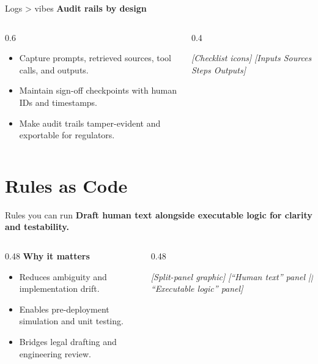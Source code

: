 \documentclass[10pt, aspectratio=169]{beamer}
\newcommand{\placeholder}[1]{\textit{[#1]}}
\begin{document}
\begin{frame}{Logs \textgreater{} vibes}
  \textbf{Audit rails by design}
  \begin{columns}[T]
    \begin{column}{0.6\textwidth}
      \begin{itemize}
        \item Capture prompts, retrieved sources, tool calls, and outputs.
        \item Maintain sign-off checkpoints with human IDs and timestamps.
        \item Make audit trails tamper-evident and exportable for regulators.
      \end{itemize}
    \end{column}
    \begin{column}{0.4\textwidth}
      \begin{block}{\placeholder{Checklist icons}}
        \centering
        \placeholder{Inputs \textbullet{} Sources \textbullet{} Steps \textbullet{} Outputs}
      \end{block}
    \end{column}
  \end{columns}
\end{frame}

\section{Rules as Code}

\begin{frame}{Rules you can run}
  \textbf{Draft human text alongside executable logic for clarity and testability.}
  \vspace{1em}
  \begin{columns}[T]
    \begin{column}{0.48\textwidth}
      \textbf{Why it matters}
      \begin{itemize}
        \item Reduces ambiguity and implementation drift.
        \item Enables pre-deployment simulation and unit testing.
        \item Bridges legal drafting and engineering review.
      \end{itemize}
    \end{column}
    \begin{column}{0.48\textwidth}
      \begin{block}{\placeholder{Split-panel graphic}}
        \centering
        \placeholder{``Human text'' panel || ``Executable logic'' panel}
      \end{block}
    \end{column}
  \end{columns}
  \vfill
  \small \parencite{better_rules_nz,oecd_rules_code}
\end{frame}
\end{document}
